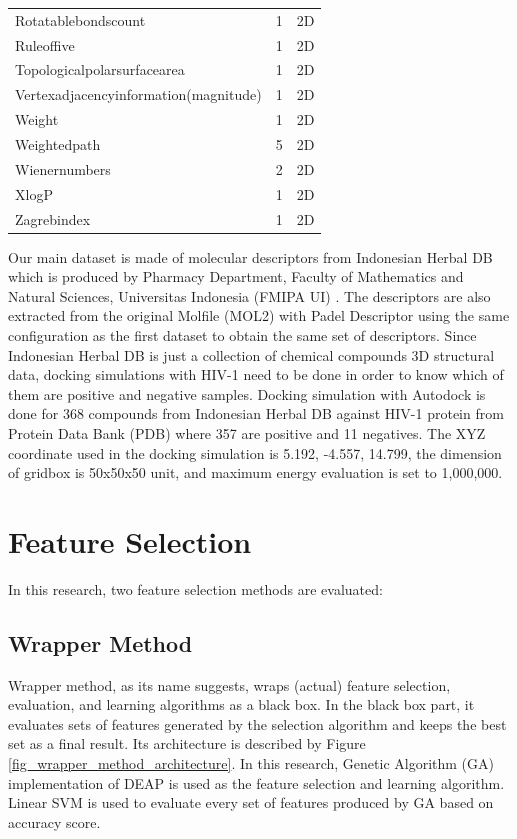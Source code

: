 \documentclass[conference]{IEEEtran}
\begin{document}
\begin{table}
\begin{tabular}{|l|c|c|}
		Rotatablebondscount & 	1  & 2D \\
		Ruleoffive & 	1  & 2D \\
		Topologicalpolarsurfacearea & 	1  & 2D \\
		Vertexadjacencyinformation(magnitude) & 	1  & 2D \\
		Weight & 	1  & 2D \\
		Weightedpath & 	5  & 2D \\
		Wienernumbers & 	2  & 2D \\
		XlogP & 	1  & 2D \\
		Zagrebindex & 	1  & 2D \\	
		\hline 
	\end{tabular} 
\end{table}	

Our main dataset is made of molecular descriptors from Indonesian Herbal DB which is produced by Pharmacy Department, Faculty of Mathematics and Natural Sciences, Universitas Indonesia (FMIPA UI) \cite{yanuar2011medicinal}. The descriptors are also extracted from the original Molfile (MOL2) with Padel Descriptor using the same configuration as the first dataset to obtain the same set of descriptors. Since Indonesian Herbal DB is just a collection of chemical compounds 3D structural data, docking simulations with HIV-1 need to be done in order to know which of them are positive and negative samples. Docking simulation with Autodock is done for 368 compounds from Indonesian Herbal DB against HIV-1 protein from Protein Data Bank (PDB) where 357 are positive and 11 negatives. The XYZ coordinate used in the docking simulation is 5.192, -4.557, 14.799, the dimension of gridbox is 50x50x50 unit, and maximum energy evaluation is set to 1,000,000.

\section{Feature Selection} \label{Feature Selection}

In this research, two feature selection methods are evaluated:

\subsection{Wrapper Method}

Wrapper method, as its name suggests, wraps (actual) feature selection, evaluation, and learning algorithms as a black box\cite{tang2014feature}. In the black box part, it evaluates sets of features generated by the selection algorithm and keeps the best set as a final result. Its architecture is described by Figure \ref{fig_wrapper_method_architecture}. In this research, Genetic Algorithm (GA) implementation of DEAP \cite{DEAP_JMLR2012} is used as the feature selection and learning algorithm. Linear SVM is used to evaluate every set of features produced by GA based on accuracy score.
\end{document}
